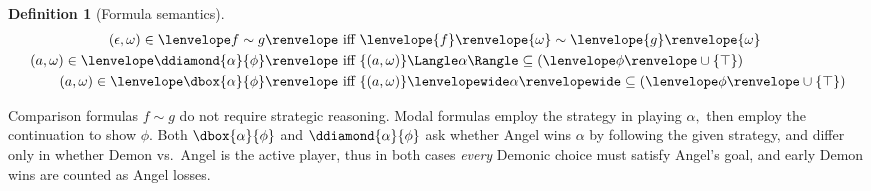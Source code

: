 \documentclass[12pt]{cmuthesis}
\theoremstyle{definition}
\newtheorem{definition}{Definition}
\theoremstyle{remark}
\newcommand{\om}{\omega}
\newcommand{\tint}[2]{\lenvelope{#1}\renvelope{#2}}
\begin{document}
\begin{definition}[Formula semantics]
\begin{align*}
(\rzNil,\om) \in  \fintR{f \sim g}                 &\text{ iff } \tint{f}{\om} \sim \tint{g}{\om}\\
(\aa,\om) \in  \fintR{\ddiamond{\alpha}{\phi}}       &\text{ iff } \strategyforR[\alpha]{\{(\aa,\om)\}} \subseteq (\fintR{\phi} \cup \{\stt\})\\
(\aa,\om) \in  \fintR{\dbox{\alpha}{\phi}}              &\text{ iff } \dstrategyforR[\alpha]{\{(\aa,\om)\}} \subseteq (\fintR{\phi} \cup \{\stt\})
\end{align*}
\end{definition}
Comparison formulas $f \sim g$ do not require strategic reasoning.
Modal formulas employ the strategy in playing $\alpha,$ then employ the continuation to show $\phi$.
Both $\dbox{\alpha}{\phi}$ and $\ddiamond{\alpha}{\phi}$ ask whether Angel wins $\alpha$ by following the given strategy, and differ only in whether Demon vs.\ Angel is the active player, thus in both cases \emph{every} Demonic choice must satisfy Angel's goal, and early Demon wins are counted as Angel losses.
\end{document}
